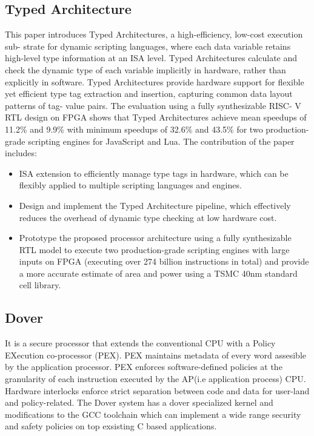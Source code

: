\subsection{Typed Architecture \cite{TypedArchitecture}}
This paper introduces Typed
Architectures, a high-efficiency, low-cost execution sub-
strate for dynamic scripting languages, where each data
variable retains high-level type information at an ISA level.
Typed Architectures calculate and check the dynamic type
of each variable implicitly in hardware, rather than explicitly
in software. Typed Architectures provide
hardware support for flexible yet efficient type tag extraction
and insertion, capturing common data layout patterns of tag-
value pairs. The evaluation using a fully synthesizable RISC-
V RTL design on FPGA shows that Typed Architectures
achieve mean speedups of 11.2\% and 9.9\% with
minimum speedups of 32.6\% and 43.5\% for two production-
grade scripting engines for JavaScript and Lua. 
The contribution of the paper includes:
\begin{itemize}
  \item ISA extension to efficiently manage
type tags in hardware, which can be flexibly applied to
multiple scripting languages and engines.
  \item Design and implement the Typed Architecture pipeline,
which effectively reduces the overhead of dynamic type
checking at low hardware cost.
  \item Prototype the proposed processor architecture using 
a fully synthesizable RTL model to execute two
production-grade scripting engines with large inputs on
FPGA (executing over 274 billion instructions in total)
and provide a more accurate estimate of area and power
using a TSMC 40nm standard cell library.
\end{itemize}

\subsection{Dover \cite{Dover}}
It is a secure processor that extends the conventional CPU with
a Policy EXecution co-processor (PEX). PEX maintains metadata 
of every word assesible by the application processor. PEX 
enforces software-defined policies
at the granularity of each instruction executed by the AP(i.e application process)
CPU. Hardware interlocks enforce strict separation between code and data 
for user-land and policy-related. The Dover system has 
a dover specialized kernel and modifications to the GCC toolchain 
which can implement a wide range security and safety policies on 
top exsisting C based applications. 

